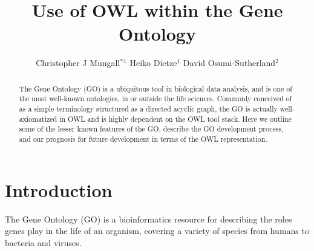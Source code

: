\documentclass{llncs}
\def\correspondingauthor{$^*$}
\begin{document}
%
\frontmatter          %

\title{Use of OWL within the Gene Ontology}
\author{
Christopher J Mungall\correspondingauthor$^{1}$
Heiko Dietze$^{1}$
David Osumi-Sutherland$^{2}$
}



\maketitle              %

\begin{abstract}

The Gene Ontology (GO) is a ubiquitous tool in biological data
analysis, and is one of the most well-known ontologies, in or outside
the life sciences. Commonly conceived of as a simple terminology
structured as a directed acyclic graph, the GO is actually
well-axiomatized in OWL and is highly dependent on the OWL tool
stack. Here we outline some of the lesser known features of the GO,
describe the GO development process, and our prognosis for future
development in terms of the OWL representation.

\end{abstract}

\section{Introduction}


The Gene Ontology (GO) is a bioinformatics resource for describing the
roles genes play in the life of an organism, covering a variety of
species from humans to bacteria and viruses.
\end{document}
